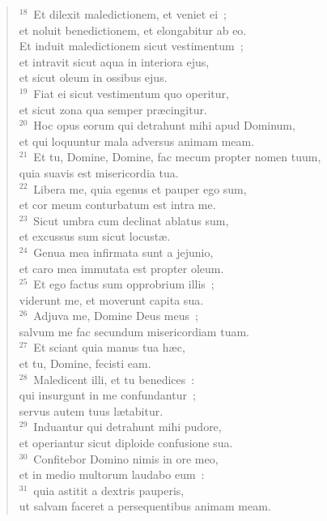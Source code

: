 \begin{verse}
${}^{18}$~Et dilexit maledictionem, et veniet ei~;\\ et noluit benedictionem, et elongabitur ab eo.\\ Et induit maledictionem sicut vestimentum~;\\ et intravit sicut aqua in interiora ejus,\\ et sicut oleum in ossibus ejus.\\
${}^{19}$~Fiat ei sicut vestimentum quo operitur,\\ et sicut zona qua semper pr\ae cingitur.\\
${}^{20}$~Hoc opus eorum qui detrahunt mihi apud Dominum,\\ et qui loquuntur mala adversus animam meam.\\
${}^{21}$~Et tu, Domine, Domine, fac mecum propter nomen tuum,\\ quia suavis est misericordia tua.\\
${}^{22}$~Libera me, quia egenus et pauper ego sum,\\ et cor meum conturbatum est intra me.\\
${}^{23}$~Sicut umbra cum declinat ablatus sum,\\ et excussus sum sicut locust\ae .\\
${}^{24}$~Genua mea infirmata sunt a jejunio,\\ et caro mea immutata est propter oleum.\\
${}^{25}$~Et ego factus sum opprobrium illis~;\\ viderunt me, et moverunt capita sua.\\
${}^{26}$~Adjuva me, Domine Deus meus~;\\ salvum me fac secundum misericordiam tuam.\\
${}^{27}$~Et sciant quia manus tua h\ae c,\\ et tu, Domine, fecisti eam.\\
${}^{28}$~Maledicent illi, et tu benedices~:\\ qui insurgunt in me confundantur~;\\ servus autem tuus l\ae tabitur.\\
${}^{29}$~Induantur qui detrahunt mihi pudore,\\ et operiantur sicut diploide confusione sua.\\
${}^{30}$~Confitebor Domino nimis in ore meo,\\ et in medio multorum laudabo eum~:\\
${}^{31}$~quia astitit a dextris pauperis,\\ ut salvam faceret a persequentibus animam meam.\end{verse}



